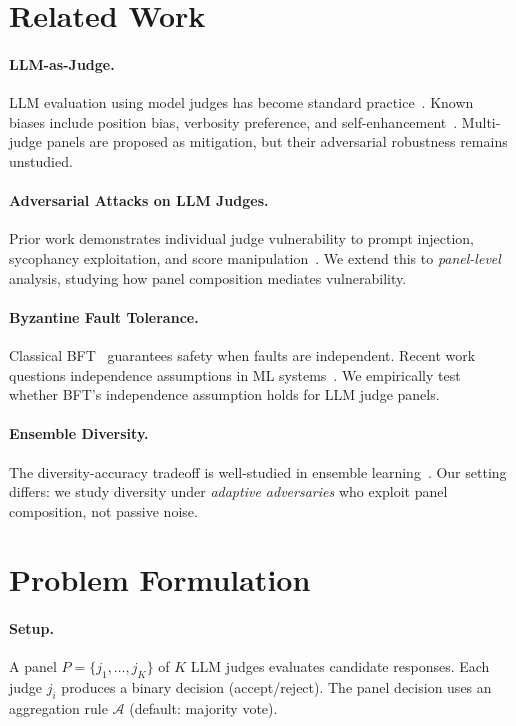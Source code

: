 \documentclass[11pt,a4paper]{article}
\begin{document}
\section{Related Work}

\paragraph{LLM-as-Judge.} LLM evaluation using model judges has become standard practice~\cite{zheng2023judging,li2023alpacaeval,dubois2024alpacafarm}. Known biases include position bias, verbosity preference, and self-enhancement~\cite{wang2023large,zheng2023judging}. Multi-judge panels are proposed as mitigation, but their adversarial robustness remains unstudied.

\paragraph{Adversarial Attacks on LLM Judges.} Prior work demonstrates individual judge vulnerability to prompt injection, sycophancy exploitation, and score manipulation~\cite{raina2024llm,shi2024optimization}. We extend this to \emph{panel-level} analysis, studying how panel composition mediates vulnerability.

\paragraph{Byzantine Fault Tolerance.} Classical BFT~\cite{lamport1982byzantine,castro1999practical} guarantees safety when faults are independent. Recent work questions independence assumptions in ML systems~\cite{sagawa2020investigation}. We empirically test whether BFT's independence assumption holds for LLM judge panels.

\paragraph{Ensemble Diversity.} The diversity-accuracy tradeoff is well-studied in ensemble learning~\cite{krogh1994neural,brown2005diversity}. Our setting differs: we study diversity under \emph{adaptive adversaries} who exploit panel composition, not passive noise.

\section{Problem Formulation}

\paragraph{Setup.} A panel $P = \{j_1, \ldots, j_K\}$ of $K$ LLM judges evaluates candidate responses. Each judge $j_i$ produces a binary decision (accept/reject). The panel decision uses an aggregation rule $\mathcal{A}$ (default: majority vote).
\end{document}

